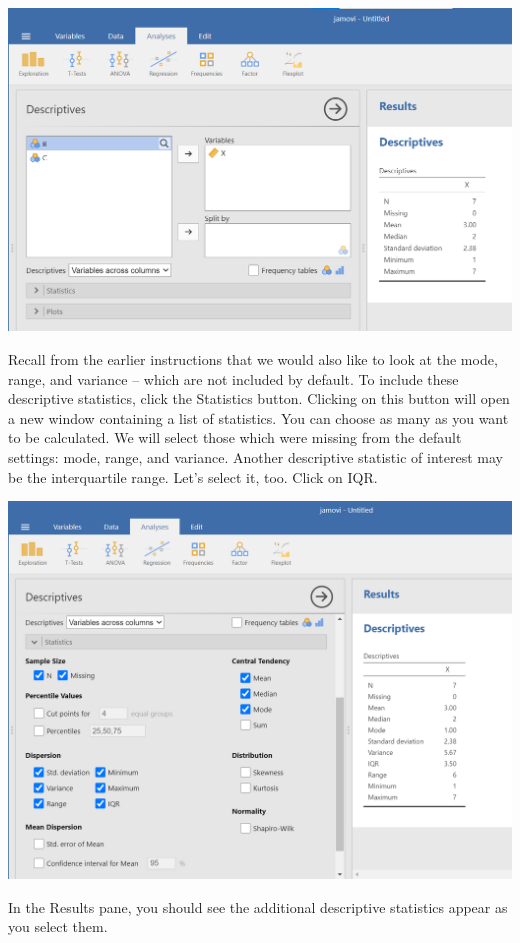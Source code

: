 \documentclass[
]{book}
\begin{document}
\includegraphics{img/2.5.3.png}

Recall from the earlier instructions that we would also like to look at the mode, range, and variance -- which are not included by default. To include these descriptive statistics, click the {Statistics} button. Clicking on this button will open a new window containing a list of statistics. You can choose as many as you want to be calculated. We will select those which were missing from the default settings: { mode, range, and variance}. Another descriptive statistic of interest may be the interquartile range. Let's select it, too. Click on { IQR}.

\includegraphics{img/2.5.4.png}

In the Results pane, you should see the additional descriptive statistics appear as you select them.
\end{document}
